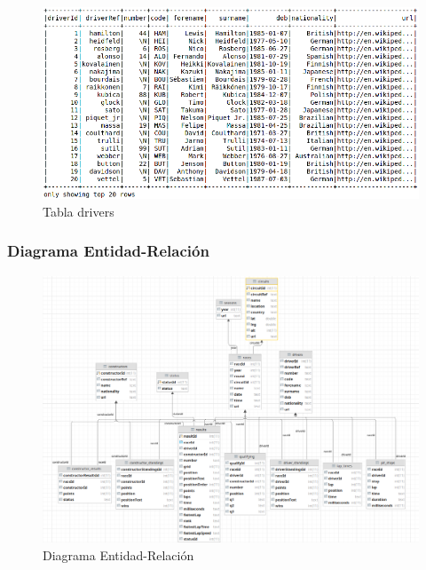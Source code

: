\documentclass[12pt,twoside,titlepage]{report}
\begin{document}
\begin{figure}
  \includegraphics[scale=0.4]{driver_table.png}
  \centering
  \caption{Tabla drivers}
  \label{fig:driverstable}
  \centering
\end{figure}

\subsubsection{Diagrama Entidad-Relación}
\begin{figure}
  \includegraphics[scale=0.4]{dataset_visualization.png}
  \centering
  \caption{Diagrama Entidad-Relación}
  \label{fig:datavisualization}
  \centering
\end{figure}



\end{document}
